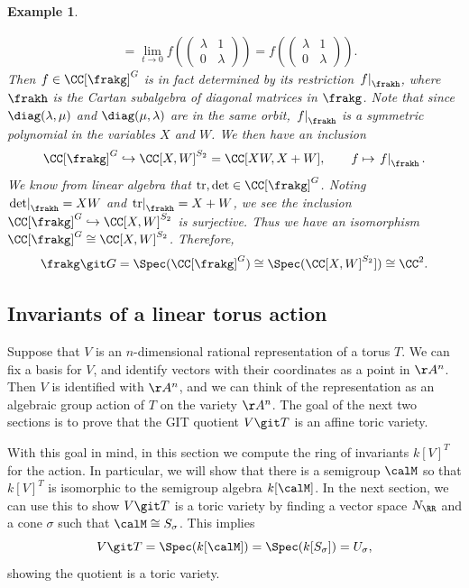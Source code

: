 \documentclass[12pt]{amsart}
\theoremstyle{plain}
\newtheorem{example}[theorem]{Example}
\begin{document}
\begin{example}
\begin{enumerate}
\begin{align*}
&= \lim_{t \to 0} f\left( \begin{pmatrix} \lambda & 1 \\ 0 & \lambda \end{pmatrix} \right) 
= f\left( \begin{pmatrix} \lambda & 1 \\ 0 & \lambda \end{pmatrix} \right).
\end{align*}
Then $f \in \CC[\frakg]^G$ is in fact determined by its restriction $\left. f \right|_{\frakh}$, where $\frakh$ is the Cartan subalgebra of diagonal matrices in $\frakg$.
Note that since $\diag(\lambda, \mu)$ and $\diag(\mu, \lambda)$ are in the same orbit, $\left. f \right|_\frakh$ is a symmetric polynomial in the variables $X$ and $W$.
We then have an inclusion
$$\CC[\frakg]^G \hookrightarrow \CC[X, W]^{S_2} = \CC[XW, X+W], \qquad f \mapsto \left. f \right|_\frakh.$$
We know from linear algebra that $\mathrm{tr}, \mathrm{det} \in \CC[\frakg]^G$.
Noting $\left. \mathrm{det} \right|_\frakh = XW$ and $\left. \mathrm{tr} \right|_\frakh = X+W$, we see the inclusion $\CC[\frakg]^G \hookrightarrow \CC[X, W]^{S_2}$ is surjective.
Thus we have an isomorphism $\CC[\frakg]^G \cong \CC[X, W]^{S_2}$.
Therefore,
$$\frakg \git G = \Spec(\CC[\frakg]^G) \cong \Spec(\CC[X, W]^{S_2}]) \cong \CC^2.$$
\end{enumerate}
\end{example}

\subsection{Invariants of a linear torus action}
Suppose that $V$ is an $n$-dimensional rational representation of a torus $T$.
We can fix a basis for $V$, and identify vectors with their coordinates as a point in $\AA^n$.
Then $V$ is identified with $\AA^n$, and we can think of the representation as an algebraic group action of $T$ on the variety $\AA^n$.
The goal of the next two sections is to prove that the GIT quotient $V \git T$ is an affine toric variety.

With this goal in mind, in this section we compute the ring of invariants $k[V]^T$ for the action.
In particular, we will show that there is a semigroup $\calM$ so that $k[V]^T$ is isomorphic to the semigroup algebra $k[\calM]$.
In the next section, we can use this to show $V \git T$ is a toric variety by finding a vector space $N_\RR$ and a cone $\sigma$ such that $\calM \cong S_\sigma$.
This implies
$$V \git T = \Spec(k[\calM]) = \Spec(k[S_\sigma]) = U_\sigma,$$
showing the quotient is a toric variety.
\end{document}

